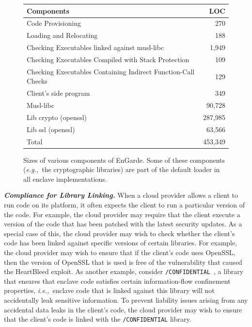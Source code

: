\documentclass[conference,compsoc]{IEEEtran}
\newcommand{\mycaption}[2]{\caption{#1}#2}
\newcommand{\myparagraph}[1]{\parskip -4pt \indent\par\noindent\textbf{\textit{#1}} \parskip 0pt}
\newcommand{\code}[1]{{\tt \footnotesize #1}}
\newcommand{\eg}{\textit{e.g.,}\xspace}
\newcommand{\ie}{\textit{i.e.,}\xspace}
\newcommand{\tool}{EnGarde\xspace} %
\begin{document}
\begin{figure}[t!]
\centering
\footnotesize{
\begin{tabular}{|p{}|r|}
\hline
 \bf Components                    & \bf LOC \\
\hline
Code Provisioning & 270\\
\hline
Loading and Relocating & 188\\
\hline
Checking Executables linked against musl-libc & 1,949\\
\hline
Checking Executables Compiled with Stack Protection & 109\\
\hline
Checking Executables Containing Indirect Function-Call Checks & 129\\
\hline
Client's side program & 349\\
\hline
Musl-libc & 90,728\\
\hline
Lib crypto (openssl) & 287,985\\
\hline
Lib ssl (openssl) & 63,566\\
\hline
Total & 453,349\\
\hline
\end{tabular}}
\mycaption{Sizes of various components of \tool. Some of these components
(\eg~the cryptographic libraries) are part of the default loader in all enclave
implementations.}
{\label{table:tcb}}
\indent\vspace{-0.5cm}
\end{figure}

\myparagraph{Compliance for Library Linking.}
%
When a cloud provider allows a client to run code on its platform, it often
expects the client to run a particular version of the code. For example, the
cloud provider may require that the client execute a version of the code that
has been patched with the latest security updates. As a special case of this,
the cloud provider may wish to check whether the client's code has been linked
against specific versions of certain libraries. For example, the cloud provider
may wish to ensure that if the client's code uses OpenSSL, then the version of
OpenSSL that is used is free of the vulnerability that caused the HeartBleed
exploit. As another example, consider
\code{/CONFIDENTIAL}~\cite{moatplus:pldi16}, a library that ensures that
enclave code satisfies certain information-flow confinement properties,
\ie~enclave code that is linked against this library will not accidentally leak
sensitive information. To prevent liability issues arising from any accidental
data leaks in the client's code, the cloud provider may wish to ensure that the
client's code is linked with the \code{/CONFIDENTIAL} library. 
\end{document}
